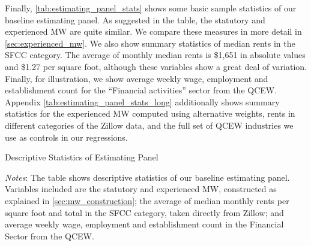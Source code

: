 Finally, \autoref{tab:estimating_panel_stats} shows some basic sample statistics of our 
baseline estimating panel. As suggested in the table, the statutory and experienced MW 
are quite similar. We compare these measures in more detail in \autoref{sec:experienced_mw}.
We also show summary statistics of median rents in the SFCC category. The average of 
monthly median rents is \$1,651 in absolute values and \$1.27 per square foot, although 
these variables show a great deal of variation. Finally, for illustration, we show average 
weekly wage, employment and establishment count for the ``Financial activities'' sector 
from the QCEW. Appendix \autoref{tab:estimating_panel_stats_long} additionally shows 
summary statistics for the experienced MW computed using alternative weights, rents in 
different categories of the Zillow data, and the full set of QCEW industries we use as 
controls in our regressions.

\begin{table}[h!]
	\caption{Descriptive Statistics of Estimating Panel}
	\centering
	\label{tab:estimating_panel_stats}    
	
	\begin{minipage}{0.95\textwidth} \footnotesize
		\vspace{3mm} 
		\textit{Notes}: The table shows descriptive statistics of our baseline estimating panel.
		Variables included are the statutory and experienced MW, constructed as explained in
		\autoref{sec:mw_construction}; the average of median monthly rents per square foot and 
		total in the SFCC category, taken directly from Zillow; and average weekly wage, employment 
		and establishment count in the Financial Sector from the QCEW.
	\end{minipage}
\end{table}
